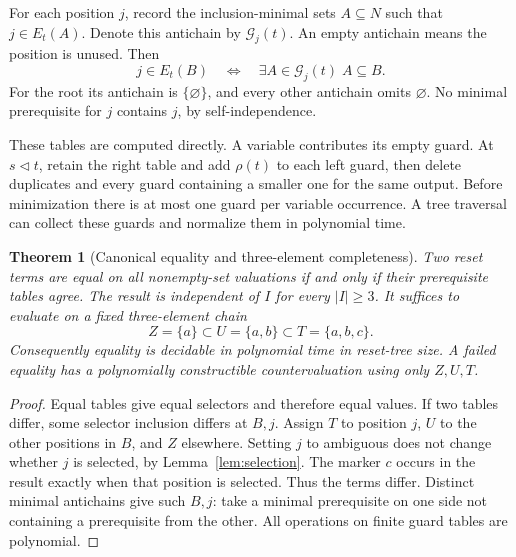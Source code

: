 \documentclass[11pt]{article}
\newtheorem{theorem}{Theorem}[section]
\newcommand{\del}{\mathbin{\triangleleft}}
\begin{document}
For each position $j$, record the inclusion-minimal sets $A\subseteq N$
such that $j\in E_t(A)$. Denote this antichain by $\mathcal G_j(t)$.
An empty antichain means the position is unused. Then
\begin{equation}\label{eq:guards}
 j\in E_t(B)\quad\Longleftrightarrow\quad
       \exists A\in\mathcal G_j(t)\; A\subseteq B.
\end{equation}
For the root its antichain is $\{\varnothing\}$, and every other
antichain omits $\varnothing$. No minimal prerequisite for $j$ contains
$j$, by self-independence.

These tables are computed directly. A variable contributes its empty
guard. At $s\del t$, retain the right table and add $\rho(t)$ to each
left guard, then delete duplicates and every guard containing a smaller
one for the same output. Before minimization there is at most one guard
per variable occurrence. A tree traversal can collect these guards and
normalize them in polynomial time.

\begin{theorem}[Canonical equality and three-element completeness]
\label{thm:three}
Two reset terms are equal on all nonempty-set valuations if and only if
their prerequisite tables agree. The result is independent of $I$ for
every $|I|\geq3$. It suffices to evaluate on a fixed three-element chain
\[
 Z=\{a\}\subset U=\{a,b\}\subset T=\{a,b,c\}.
\]
Consequently equality is decidable in polynomial time in reset-tree size.
A failed equality has a polynomially constructible countervaluation
using only $Z,U,T$.
\end{theorem}
\begin{proof}
Equal tables give equal selectors and therefore equal values.
If two tables differ, some selector inclusion differs at $B,j$.
Assign $T$ to position $j$, $U$ to the other positions in $B$, and $Z$
elsewhere. Setting $j$ to ambiguous does not change whether $j$ is
selected, by Lemma~\ref{lem:selection}. The marker $c$ occurs in the
result exactly when that position is selected. Thus the terms differ.
Distinct minimal antichains give such $B,j$: take a minimal prerequisite
on one side not containing a prerequisite from the other. All operations
on finite guard tables are polynomial.
\end{proof}
\end{document}
